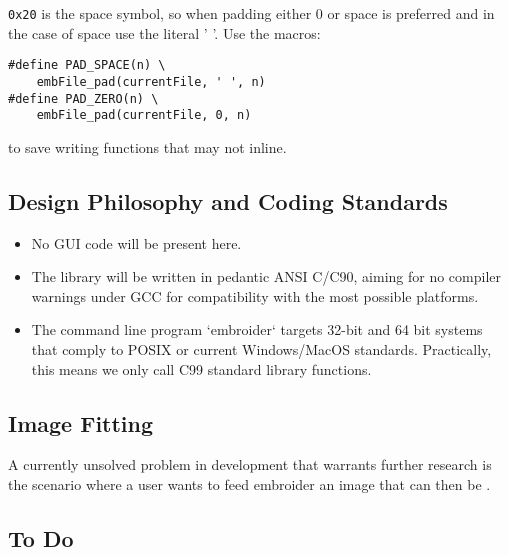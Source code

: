 \documentclass[onesize, a4paper]{refart}
\begin{document}
\texttt{0x20} is the space symbol, so when padding either 0 or space is preferred and in the case of space use the literal ' '. Use the macros:

\begin{verbatim}
#define PAD_SPACE(n) \
    embFile_pad(currentFile, ' ', n)
#define PAD_ZERO(n) \
    embFile_pad(currentFile, 0, n)
\end{verbatim}

to save writing functions that may not inline.

\subsection{Design Philosophy and Coding Standards}

\begin{itemize} 
\item No GUI code will be present here.
\item The library will be written in pedantic ANSI C/C90, aiming for no compiler warnings under GCC for compatibility with the most possible platforms.
\item The command line program `embroider` targets 32-bit and 64 bit systems that comply to POSIX or current Windows/MacOS standards. Practically, this means we only call C99 standard library functions.
\end{itemize}

\subsection{Image Fitting}

A currently unsolved problem in development that warrants further research
is the scenario where a user wants to feed embroider an image that can
then be .

\subsection{To Do}
\end{document}
